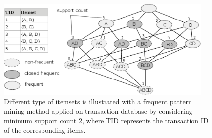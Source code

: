 \begin{figure}
  \includegraphics[width=0.95\textwidth]{figures/fpm.eps}
\caption{Different type of itemsets is illustrated with a frequent pattern mining method applied on transaction database by considering minimum support count 2, where TID represents the transaction ID of the corresponding items.}
\label{fig:fpm}       %
\end{figure}


